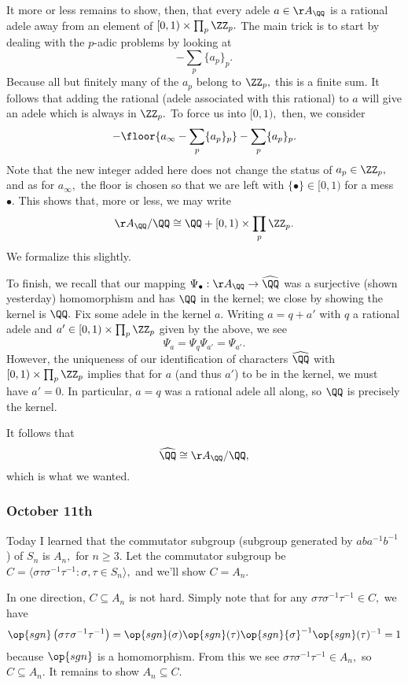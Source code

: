 It more or less remains to show, then, that every adele $a\in\AA_\QQ$ is a rational adele away from an element of $[0,1)\times\prod_p\ZZ_p.$ The main trick is to start by dealing with the $p$-adic problems by looking at
\[-\sum_p\{a_p\}_p.\]
Because all but finitely many of the $a_p$ belong to $\ZZ_p,$ this is a finite sum. It follows that adding the rational (adele associated with this rational) to $a$ will give an adele which is always in $\ZZ_p.$ To force us into $[0,1),$ then, we consider
\[-\floor{a_\infty-\sum_p\{a_p\}_p}-\sum_p\{a_p\}_p.\]
Note that the new integer added here does not change the status of $a_p\in\ZZ_p,$ and as for $a_\infty,$ the floor is chosen so that we are left with $\{\bullet\}\in[0,1)$ for a mess $\bullet.$ This shows that, more or less, we may write
\[\AA_\QQ/\QQ\cong\QQ+[0,1)\times\prod_p\ZZ_p.\]
We formalize this slightly.

To finish, we recall that our mapping $\Psi_\bullet:\AA_\QQ\to\widehat\QQ$ was a surjective (shown yesterday) homomorphism and has $\QQ$ in the kernel; we close by showing the kernel is $\QQ.$ Fix some adele in the kernel $a.$ Writing $a=q+a'$ with $q$ a rational adele and $a'\in[0,1)\times\prod_p\ZZ_p$ given by the above, we see
\[\Psi_a=\Psi_q\Psi_{a'}=\Psi_{a'}.\]
However, the uniqueness of our identification of characters $\widehat\QQ$ with $[0,1)\times\prod_p\ZZ_p$ implies that for $a$ (and thus $a'$) to be in the kernel, we must have $a'=0.$ In particular, $a=q$ was a rational adele all along, so $\QQ$ is precisely the kernel.

It follows that
\[\widehat\QQ\cong\AA_\QQ/\QQ,\]
which is what we wanted.

\subsubsection{October 11th}
Today I learned that the commutator subgroup (subgroup generated by $aba^{-1}b^{-1}$) of $S_n$ is $A_n,$ for $n\ge3.$ Let the commutator subgroup be $C=\langle \sigma\tau\sigma^{-1}\tau^{-1}:\sigma,\tau\in S_n\rangle,$ and we'll show $C=A_n.$

In one direction, $C\subseteq A_n$ is not hard. Simply note that for any $\sigma\tau\sigma^{-1}\tau^{-1}\in C,$ we have
\[\op{sgn}\left(\sigma\tau\sigma^{-1}\tau^{-1}\right)=\op{sgn}(\sigma)\op{sgn}(\tau)\op{sgn}{\sigma}^{-1}\op{sgn}(\tau)^{-1}=1\]
because $\op{sgn}$ is a homomorphism. From this we see $\sigma\tau\sigma^{-1}\tau^{-1}\in A_n,$ so $C\subseteq A_n.$ It remains to show $A_n\subseteq C.$

